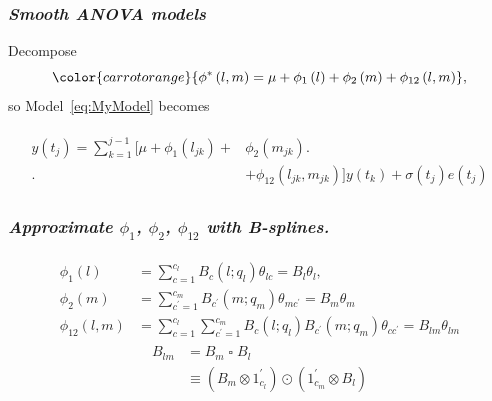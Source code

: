 \documentclass[12pt]{beamer}
\newcommand{\carrotorangemath}[1]{{ \color{carrotorange} {#1}}}
\newcommand{\ms}{\scriptscriptstyle}
\begin{document}
\begin{frame}
\frametitle{\emph{Smooth ANOVA models}}
Decompose
\begin{equation} \label{eq:SANOVA-model}
\carrotorangemath{
\phi^*\left(l,m\right) = \mu + \phi_1\left(l\right) + \phi_2\left(m\right) + \phi_{12}\left(l,m\right)},
\end{equation} 
so Model~\ref{eq:MyModel} becomes

\begin{align*}  
\begin{split}%
 y\left(t_j \right)  = \sum_{k=1}^{j-1} \bigg[\mu + \phi_1\left(l_{jk}\right) +  &\phi_2\left(m_{jk}\right) \bigg.\\[-2ex]
\bigg. &+ \phi_{12}\left(l_{jk},m_{jk}\right) \bigg]y\left(t_k\right)+ \sigma\left(t_j\right)e\left({t_j}\right)
\end{split}
\end{align*}
\end{frame}


\begin{frame}
\frametitle{\emph{Approximate $\phi_1$, $\phi_2$, $\phi_{12}$ with B-splines.}}

\begin{align}  
\begin{split}\label{eq:l-m-marginal-basis}
\phi_1\left(l\right)  &=\sum_{c=1}^{c_l} B_{\ms c}\left(l;q_l\right) \theta_{lc } = B_{\ms l} \theta_l, \\
\phi_2\left(m\right)  &= \sum_{c^\prime=1}^{c_m} B_{\ms{c^\prime}}  \left(  m;q_m  \right)  \theta_{\ms{mc^\prime }}  = B_{\ms m} \theta_{\ms m} \\
\phi_{12}\left(l,m\right)  &= \sum_{c=1}^{c_l} \sum_{{c^\prime}=1}^{c_m} B_{\ms c}\left(l;q_l\right) B_{\ms{c^\prime } }\left(m;q_m\right)\theta_{\ms{c c^\prime} } = B_{\ms{lm}}\theta_{\ms{lm}}
\end{split}
\end{align}
\begin{align*}
B_{\ms{lm}} &= B_m \; \square \; B_l \\   
&\equiv \left( B_m \otimes 1^\prime_{c_l} \right) \odot \left(1^\prime_{c_m} \otimes  B_l  \right)    
\end{align*}
\end{frame}
\end{document}

